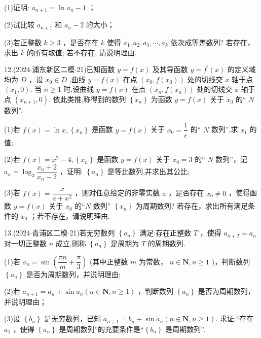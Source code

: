(1)证明: ${a}_{n + 1} = \ln {a}_{n} - 1$ ；

(2)试比较 ${a}_{n + 1}$ 和 ${a}_{n} - 2$ 的大小；

(3)若正整数 $k \geq  3$ ，是否存在 $k$ 使得 ${a}_{1},{a}_{2},{a}_{3},\cdots ,{a}_{k}$ 依次成等差数列? 若存在，求出 $k$ 的所有取值; 若不存在, 请说明理由.

12.(2024$\cdot$浦东新区二模$\cdot$21)已知函数 $y = f\left( x\right)$ 及其导函数 $y = {f}^{\prime }\left( x\right)$ 的定义域均为 $D$ ，设 ${x}_{0} \in  D$ ,曲线 $y = f\left( x\right)$ 在点 $\left( {{x}_{0},f\left( {x}_{0}\right) }\right)$ 处的切线交 $x$ 轴于点 $\left( {{x}_{1},0}\right)$. 当 $n \geq  1$ 时,设曲线 $y = f\left( x\right)$ 在点 $\left( {{x}_{n},f\left( {x}_{n}\right) }\right)$ 处的切线交 $x$ 轴于点 $\left( {{x}_{n + 1},0}\right)$. 依此类推,称得到的数列 $\left\{  {x}_{n}\right\}$ 为函数 $y = f\left( x\right)$ 关于 ${x}_{0}$ 的“ $N$ 数列”.

(1)若 $f\left( x\right)  = \ln x,\left\{  {x}_{n}\right\}$ 是函数 $y = f\left( x\right)$ 关于 ${x}_{0} = \dfrac{1}{{e}}$ 的“ $N$ 数列”,求 ${x}_{1}$ 的值;

(2)若 $f\left( x\right)  = {x}^{2} - 4,\left\{  {x}_{n}\right\}$ 是函数 $y = f\left( x\right)$ 关于 ${x}_{0} = 3$ 的“ $N$ 数列”，记 ${a}_{n} = {\log }_{3}\dfrac{{x}_{n} + 2}{{x}_{n} - 2}$ ，证明: $\left\{  {a}_{n}\right\}$ 是等比数列,并求出其公比;

(3)若 $f\left( x\right)  = \dfrac{x}{a + {x}^{2}}$ ，则对任意给定的非零实数 $a$ ，是否存在 ${x}_{0} \neq  0$ ，使得函数 $y = f\left( x\right)$ 关于 ${x}_{0}$ 的“$N$ 数列” $\left\{  {x}_{n}\right\}$ 为周期数列? 若存在，求出所有满足条件的 ${x}_{0}$ ；若不存在，请说明理由.

13.(2024$\cdot$青浦区二模$\cdot$21)若无穷数列 $\left\{  {a}_{n}\right\}$ 满足:存在正整数 $T$ ，使得 ${a}_{n + T} = {a}_{n}$ 对一切正整数 $n$ 成立,则称 $\left\{  {a}_{n}\right\}$ 是周期为 $T$ 的周期数列.

(1)若 ${a}_{n} = \sin \left( {\dfrac{\pi n}{m} + \dfrac{\pi }{3}}\right)$ (其中正整数 $m$ 为常数， $n \in  \mathbf{N},n \geq  1$ )，判断数列 $\left\{  {a}_{n}\right\}$ 是否为周期数列，并说明理由;

(2)若 ${a}_{n + 1} = {a}_{n} + \sin {a}_{n}\left( {n \in  \mathbf{N},n \geq  1}\right)$ ，判断数列 $\left\{  {a}_{n}\right\}$ 是否为周期数列，并说明理由；

(3)设 $\left\{  {b}_{n}\right\}$ 是无穷数列，已知 ${a}_{n + 1} = {b}_{n} + \sin {a}_{n}\left( {n \in  \mathbf{N},n \geq  1}\right)$. 求证:“存在 ${a}_{1}$ ，使得 $\left\{  {a}_{n}\right\}$ 是周期数列”的充要条件是“$\left\{  {b}_{n}\right\}$ 是周期数列”.

